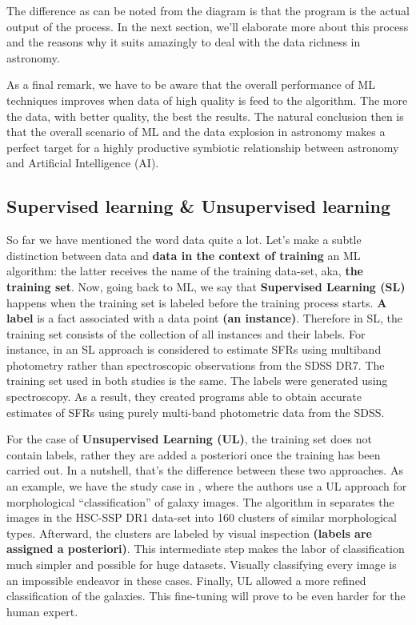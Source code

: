 The difference as can be noted from the diagram is that the program is the actual output of the process. In the next section, we'll elaborate more about this process and the reasons why it suits amazingly to deal with the data richness in astronomy. 

As a final remark, we have to be aware that the overall performance of ML techniques improves when data of high quality is feed to the algorithm. The more the data, with better quality, the best the results. The natural conclusion then is that the overall scenario of ML and the data explosion in astronomy makes a perfect target for a highly productive symbiotic relationship between astronomy and Artificial Intelligence (AI).


\subsection{Supervised learning \& Unsupervised learning}

So far we have mentioned the word data quite a lot. Let's make a subtle distinction between data and \textbf{data in the context of training} an ML algorithm: the latter receives the name of the training data-set, aka, \textbf{the training set}. Now, going back to ML, we say that \textbf{Supervised Learning (SL)} happens when the training set is labeled before the training process starts. \textbf{A label} is a fact associated with a data point \textbf{(an instance)}. Therefore in SL, the training set consists of the collection of all instances and their labels. For instance, in \cite{Stensbo-Smidt2017, Delli2019} an SL approach is considered to estimate SFRs using multiband photometry rather than spectroscopic observations from the SDSS DR7. The training set used in both studies is the same. The labels were generated using spectroscopy. As a result, they created programs able to obtain accurate estimates of SFRs using purely multi-band photometric data from the SDSS.

For the case of \textbf{Unsupervised Learning (UL)}, the training set does not contain labels, rather they are added a posteriori once the training has been carried out. In a nutshell, that's the difference between these two approaches. As an example, we have the study case in \cite{Martin2019}, where the authors use a UL approach for morphological ``classification'' of galaxy images. The algorithm in \cite{Martin2019} separates the images in the  HSC-SSP DR1 data-set into 160 clusters of similar morphological types. Afterward, the clusters are labeled by visual inspection \textbf{(labels are assigned a posteriori)}. This intermediate step makes the labor of classification much simpler and possible for huge datasets. Visually classifying every image is an impossible endeavor in these cases. Finally, UL allowed a more refined classification of the galaxies. This fine-tuning will prove to be even harder for the human expert.

